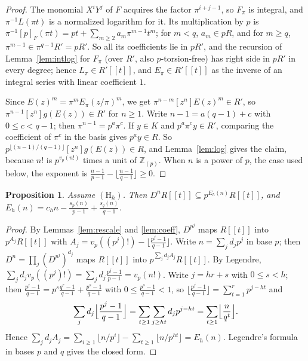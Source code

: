 \documentclass[11pt]{amsart}
\newtheorem{proposition}[thm]{Proposition}
\theoremstyle{definition}
\theoremstyle{remark}
\newcommand{\Z}{\mathbb Z}
\newcommand{\vp}{v_p}
\begin{document}
\begin{proof}
The monomial $X^iY^j$ of $F$ acquires the factor $\pi^{i+j-1}$, so $F_\pi$ is integral, and $\pi^{-1}L(\pi t)$ is a normalized logarithm for it. Its multiplication by $p$ is $\pi^{-1}[p]_F(\pi t)=pt+\sum_{m\ge2}a_m\pi^{m-1}t^m$; for $m<q$, $a_m\in pR$, and for $m\ge q$, $\pi^{m-1}\in\pi^{q-1}R'=pR'$. So all its coefficients lie in $pR'$, and the recursion of Lemma~\ref{lem:intlog} for $F_\pi$ (over $R'$, also $p$-torsion-free) has right side in $pR'$ in every degree; hence $L_\pi\in R'[[t]]$, and $E_\pi\in R'[[t]]$ as the inverse of an integral series with linear coefficient $1$.

Since $E(z)^m=\pi^mE_\pi(z/\pi)^m$, we get $\pi^{n-m}[z^n]E(z)^m\in R'$, so $\pi^{n-1}[z^n]g(E(z))\in R'$ for $n\ge1$. Write $n-1=a(q-1)+c$ with $0\le c<q-1$; then $\pi^{n-1}=p^a\pi^c$. If $y\in K$ and $p^a\pi^cy\in R'$, comparing the coefficient of $\pi^c$ in the basis gives $p^ay\in R$. So $p^{\lfloor(n-1)/(q-1)\rfloor}[z^n]g(E(z))\in R$, and Lemma~\ref{lem:log} gives the claim, because $n!$ is $p^{\vp(n!)}$ times a unit of $\Z_{(p)}$. When $n$ is a power of $p$, the case used below, the exponent is $\frac{n-1}{p-1}-\lfloor\frac{n-1}{q-1}\rfloor\ge0$.
\end{proof}

\begin{proposition}\label{prop:floor}
Assume $(\mathrm H_h)$. Then $D^nR[[t]]\subseteq p^{E_h(n)}R[[t]]$, and $E_h(n)=c_hn-\frac{s_p(n)}{p-1}+\frac{s_q(n)}{q-1}$.
\end{proposition}

\begin{proof}
By Lemmas~\ref{lem:rescale} and \ref{lem:coeff}, $D^{p^j}$ maps $R[[t]]$ into $p^{A_j}R[[t]]$ with $A_j=\vp((p^j)!)-\lfloor\frac{p^j-1}{q-1}\rfloor$. Write $n=\sum_jd_jp^j$ in base $p$; then $D^n=\prod_j(D^{p^j})^{d_j}$ maps $R[[t]]$ into $p^{\sum_jd_jA_j}R[[t]]$. By Legendre, $\sum_jd_j\vp((p^j)!)=\sum_jd_j\frac{p^j-1}{p-1}=\vp(n!)$. Write $j=hr+s$ with $0\le s<h$; then $\frac{p^j-1}{q-1}=p^s\frac{q^r-1}{q-1}+\frac{p^s-1}{q-1}$ with $0\le\frac{p^s-1}{q-1}<1$, so $\lfloor\frac{p^j-1}{q-1}\rfloor=\sum_{t=1}^{r}p^{j-ht}$ and
\[
 \sum_jd_j\Bigl\lfloor\frac{p^j-1}{q-1}\Bigr\rfloor=\sum_{t\ge1}\sum_{j\ge ht}d_jp^{j-ht}=\sum_{t\ge1}\Bigl\lfloor\frac n{q^t}\Bigr\rfloor .
\]
Hence $\sum_jd_jA_j=\sum_{i\ge1}\lfloor n/p^i\rfloor-\sum_{t\ge1}\lfloor n/p^{ht}\rfloor=E_h(n)$. Legendre's formula in bases $p$ and $q$ gives the closed form.
\end{proof}
\end{document}
